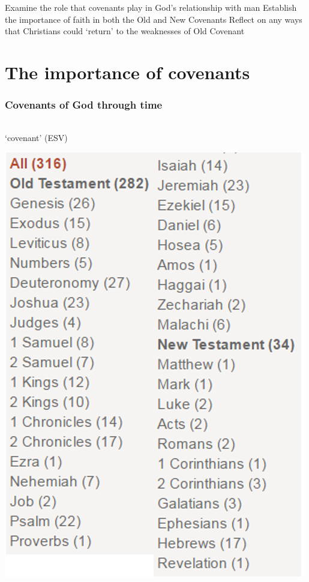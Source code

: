 \begin{goals}
\goal Examine the role that covenants play in God's relationship with man
\goal Establish the importance of faith in both the Old and New Covenants
\goal Reflect on any ways that Christians could `return' to the weaknesses of Old Covenant
\end{goals}

\section{The importance of covenants}

\begin{frame}
\frametitle{Covenants of God through time}
\framesubtitle{}
\begin{columns}[T]
\begin{column}{0.4\textwidth}
	`covenant' (ESV)
	\begin{center}
	\includegraphics[width=\columnwidth]{figures/covenant.png}

\end{center}
\end{column}
\end{columns}
\end{frame}
